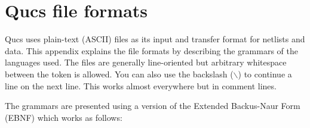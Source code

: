 %
%
%
%

\chapter{Qucs file formats}
\label{sec:qucsfiles}

%
%
\newcommand\tok[1]{`{\bf #1}'}  %
\newcommand\ntok[1]{{\bf #1}}   %
\newcommand\bsl[1]{\tok{$\backslash$#1}}
\newenvironment{grammar}%
  {\newcommand\produces[2]{##1 \> $\rightarrow$ \> ##2 \\}
   \newcommand\orproduces[1]{\> \> \makebox[0pt][r]{$|$ }##1 \\}
   \newcommand\opt[1]{[ ##1 ]}
   \newcommand\rep[1]{\{ ##1 \}}
   \newcommand\alt[0]{$|$}
   \newcommand\group[1]{( ##1 )}
   \newcommand\emptyprod{{$\varepsilon$}}
   \newcommand\heading[1]{\rule{\linewidth}{1pt} \\{\bf ##1}\\[2ex]}
   \newcommand\separator{\rule{\linewidth}{1pt} \\}
   \begin{tabbing}
   \qquad\qquad\qquad\qquad \= \qquad \= \kill}
  {\end{tabbing}}

\def\REalpha{\tok{a} \alt{}~\dots~\alt{} \tok{z} \alt{}
             \tok{A} \alt{}~\dots~\alt{} \tok{Z}}
\def\REalnum{\REalpha \alt{} \tok{0}~\dots~\tok{9} \alt{} \tok{\_}}
\def\REplusminus{\opt{\tok{+} \alt{} \tok{-}}}

%
%
Qucs uses plain-text (ASCII) files as its input and transfer format for
netlists and data. This appendix explains the file formats by
describing the grammars of the languages used. The files are generally
line-oriented but arbitrary whitespace between the token is
allowed. You can also use the backslash ($\backslash$) to continue a
line on the next line. This works almost everywhere but in
comment lines.

The grammars are presented using a version of the Extended Backus-Naur
Form (EBNF) which works as follows:

